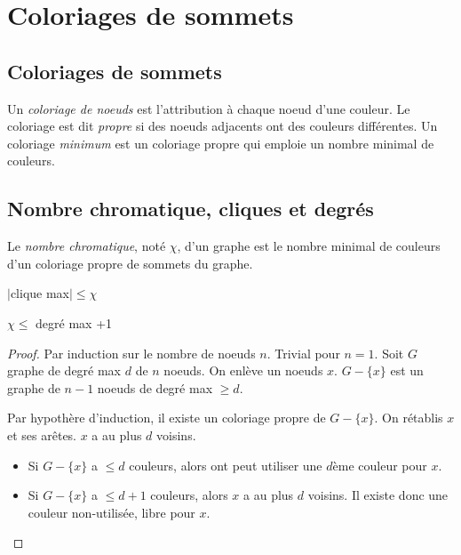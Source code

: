 \section{Coloriages de sommets}
\subsection{Coloriages de sommets}
\begin{mydef}
  Un \emph{coloriage de noeuds} est l’attribution à chaque noeud d’une couleur.
  Le coloriage est dit \emph{propre} si des noeuds adjacents ont des couleurs différentes. 
  Un coloriage \emph{minimum} est un coloriage propre qui emploie un nombre minimal de couleurs.
\end{mydef}

\subsection{Nombre chromatique, cliques et degrés}
\begin{mydef}
  Le \emph{nombre chromatique}, noté $\chi$, d’un graphe est le nombre minimal de couleurs d’un coloriage propre de sommets du graphe.
\end{mydef}

\begin{mytheo}
  $|$clique max$| \leq \chi$
\end{mytheo}

\begin{mytheo}
  $\chi \leq $ degré max +1
  \begin{proof}
    Par induction sur le nombre de noeuds $n$. 
    Trivial pour $n = 1$.
    Soit $G$ graphe de degré max $d$ de $n$ noeuds. On enlève un noeuds $x$. $G-\{x\}$ est un graphe de $n-1$ noeuds de degré max $\geq d$.
    
    Par hypothère d'induction, il existe un coloriage propre de $G-\{x\}$.
    On rétablis $x$ et ses arêtes. $x$ a au plus $d $ voisins.
    
    \begin{itemize}
    \item Si  $G-\{x\}$ a $\leq d$ couleurs, alors ont peut utiliser une $d$ème couleur pour $x$.
    \item  Si $G-\{x\}$ a $\leq d+1$ couleurs, alors $x$ a au plus $d$ voisins. Il existe donc une couleur non-utilisée, libre pour $x$.
    \end{itemize}
  \end{proof}
\end{mytheo}

